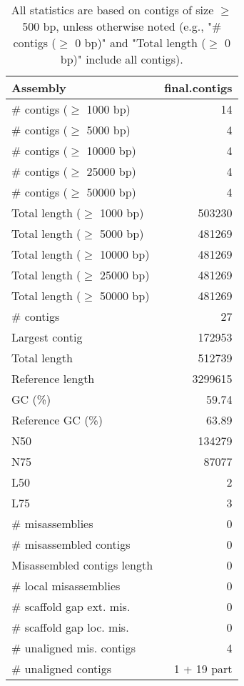 \documentclass[12pt,a4paper]{article}
\begin{document}
\begin{table}[ht]
\begin{center}
\caption{All statistics are based on contigs of size $\geq$ 500 bp, unless otherwise noted (e.g., "\# contigs ($\geq$ 0 bp)" and "Total length ($\geq$ 0 bp)" include all contigs).}
\begin{tabular}{|l*{1}{|r}|}
\hline
Assembly & final.contigs \\ \hline
\# contigs ($\geq$ 1000 bp) & 14 \\ \hline
\# contigs ($\geq$ 5000 bp) & 4 \\ \hline
\# contigs ($\geq$ 10000 bp) & 4 \\ \hline
\# contigs ($\geq$ 25000 bp) & 4 \\ \hline
\# contigs ($\geq$ 50000 bp) & 4 \\ \hline
Total length ($\geq$ 1000 bp) & 503230 \\ \hline
Total length ($\geq$ 5000 bp) & 481269 \\ \hline
Total length ($\geq$ 10000 bp) & 481269 \\ \hline
Total length ($\geq$ 25000 bp) & 481269 \\ \hline
Total length ($\geq$ 50000 bp) & 481269 \\ \hline
\# contigs & 27 \\ \hline
Largest contig & 172953 \\ \hline
Total length & 512739 \\ \hline
Reference length & 3299615 \\ \hline
GC (\%) & 59.74 \\ \hline
Reference GC (\%) & 63.89 \\ \hline
N50 & 134279 \\ \hline
N75 & 87077 \\ \hline
L50 & 2 \\ \hline
L75 & 3 \\ \hline
\# misassemblies & 0 \\ \hline
\# misassembled contigs & 0 \\ \hline
Misassembled contigs length & 0 \\ \hline
\# local misassemblies & 0 \\ \hline
\# scaffold gap ext. mis. & 0 \\ \hline
\# scaffold gap loc. mis. & 0 \\ \hline
\# unaligned mis. contigs & 4 \\ \hline
\# unaligned contigs & 1 + 19 part \\ \hline

\end{tabular}
\end{center}
\end{table}
\end{document}
